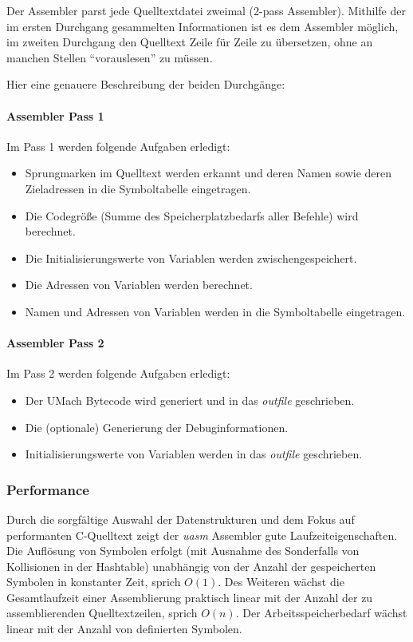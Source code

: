 Der Assembler parst jede Quelltextdatei zweimal (2-pass Assembler). Mithilfe der
im ersten Durchgang gesammelten Informationen ist es dem Assembler möglich, im
zweiten Durchgang den Quelltext Zeile für Zeile zu übersetzen, ohne an manchen
Stellen ``vorauslesen'' zu müssen.

Hier eine genauere Beschreibung der beiden Durchgänge:

\paragraph{Assembler Pass 1}

Im Pass 1 werden folgende Aufgaben erledigt:
\begin{itemize}
    \item Sprungmarken im Quelltext werden erkannt und deren Namen sowie deren
          Ziel\-adressen in die Symboltabelle eingetragen.
    \item Die Codegröße (Summe des Speicherplatzbedarfs aller Befehle) wird
          berechnet.
    \item Die Initialisierungswerte von Variablen werden zwischengespeichert.
    \item Die Adressen von Variablen werden berechnet.
    \item Namen und Adressen von Variablen werden in die Symboltabelle
          eingetragen.
\end{itemize}

\paragraph{Assembler Pass 2}

Im Pass 2 werden folgende Aufgaben erledigt:
\begin{itemize}
    \item Der UMach Bytecode wird generiert und in das \emph{outfile}
          geschrieben.
    \item Die (optionale) Generierung der Debuginformationen.
    \item Initialisierungswerte von Variablen werden in das \emph{outfile}
          geschrieben.
\end{itemize}

\subsubsection{Performance}

Durch die sorgfältige Auswahl der Datenstrukturen und dem Fokus auf performanten
C-Quelltext zeigt der \emph{uasm} Assembler gute Laufzeiteigenschaften.
Die Auflösung von Symbolen erfolgt (mit Ausnahme des Sonderfalls von Kollisionen
in der Hashtable) unabhängig von der Anzahl der gespeicherten Symbolen in
konstanter Zeit, sprich $O(1)$.
Des Weiteren wächst die Gesamtlaufzeit einer Assemblierung praktisch linear mit
der Anzahl der zu assemblierenden Quelltextzeilen, sprich $O(n)$.
Der Arbeitsspeicherbedarf wächst linear mit der Anzahl von definierten Symbolen.

